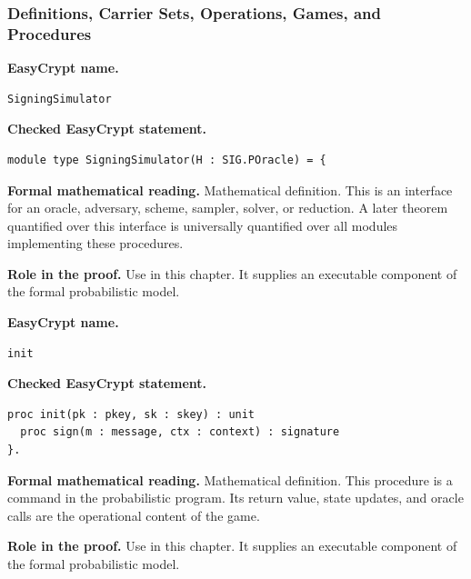 \subsubsection*{Definitions, Carrier Sets, Operations, Games, and Procedures}
\begin{formaldefinition}
\noindent\textbf{EasyCrypt name.}
\begin{lstlisting}[language=EasyCrypt,basicstyle=\ttfamily\scriptsize]
SigningSimulator
\end{lstlisting}
\noindent\textbf{Checked EasyCrypt statement.}
\begin{lstlisting}[language=EasyCrypt,basicstyle=\ttfamily\scriptsize]
module type SigningSimulator(H : SIG.POracle) = {
\end{lstlisting}
\noindent\textbf{Formal mathematical reading.}
Mathematical definition. This is an interface for an oracle, adversary, scheme, sampler, solver, or reduction.  A later theorem quantified over this interface is universally quantified over all modules implementing these procedures.

\noindent\textbf{Role in the proof.}
Use in this chapter. It supplies an executable component of the formal probabilistic model.

\end{formaldefinition}

\begin{formaldefinition}
\noindent\textbf{EasyCrypt name.}
\begin{lstlisting}[language=EasyCrypt,basicstyle=\ttfamily\scriptsize]
init
\end{lstlisting}
\noindent\textbf{Checked EasyCrypt statement.}
\begin{lstlisting}[language=EasyCrypt,basicstyle=\ttfamily\scriptsize]
proc init(pk : pkey, sk : skey) : unit
  proc sign(m : message, ctx : context) : signature
}.
\end{lstlisting}
\noindent\textbf{Formal mathematical reading.}
Mathematical definition. This procedure is a command in the probabilistic program.  Its return value, state updates, and oracle calls are the operational content of the game.

\noindent\textbf{Role in the proof.}
Use in this chapter. It supplies an executable component of the formal probabilistic model.

\end{formaldefinition}

